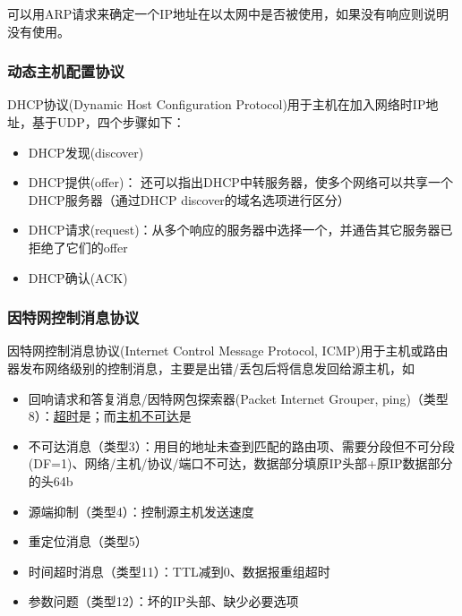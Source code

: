 可以用ARP请求来确定一个IP地址在以太网中是否被使用，如果没有响应则说明没有使用。

\subsubsection{动态主机配置协议}
DHCP协议(Dynamic Host Configuration Protocol)用于主机在加入网络时IP地址，基于UDP，四个步骤如下：
\begin{itemize}
	\item DHCP发现(discover)
	\item DHCP提供(offer)： 还可以指出DHCP中转服务器，使多个网络可以共享一个DHCP服务器（通过DHCP discover的域名选项进行区分）
	\item DHCP请求(request)：从多个响应的服务器中选择一个，并通告其它服务器已拒绝了它们的offer
	\item DHCP确认(ACK)
\end{itemize}

\subsubsection{因特网控制消息协议}
因特网控制消息协议(Internet Control Message Protocol, ICMP)用于主机或路由器发布网络级别的控制消息，主要是出错/丢包后将信息发回给源主机，如
\begin{itemize}
	\item 回响请求和答复消息/因特网包探索器(Packet Internet Grouper, ping)（类型8）：\underline{超时}是；而\underline{主机不可达}是
	\item 不可达消息（类型3）：用目的地址未查到匹配的路由项、需要分段但不可分段(DF=1)、网络/主机/协议/端口不可达，数据部分填原IP头部+原IP数据部分的头64b
	\item 源端抑制（类型4）：控制源主机发送速度
	\item 重定位消息（类型5）
	\item 时间超时消息（类型11）：TTL减到0、数据报重组超时
	\item 参数问题（类型12）：坏的IP头部、缺少必要选项
\end{itemize}

